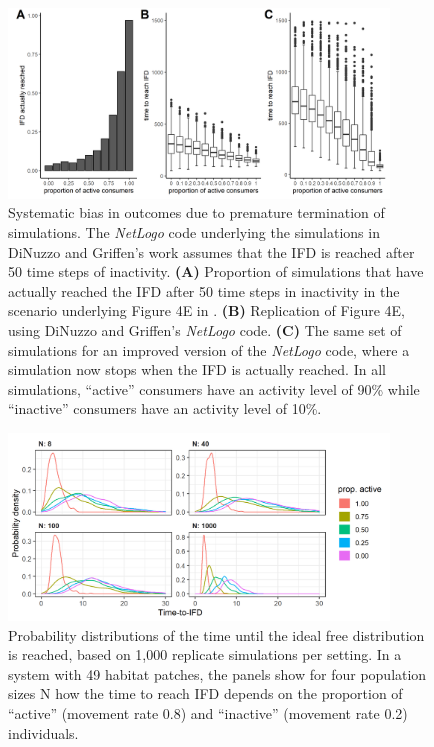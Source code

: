 \begin{interludeenv}
	\begin{figure}[!h]
		\centering
		\includegraphics[width=0.9\textwidth]{figures/boxes/details2.png}
		\caption{
			Systematic bias in outcomes due to premature termination of simulations. 
			The \textit{NetLogo} code underlying the simulations in DiNuzzo and Griffen's work assumes that the IFD is reached after 50 time steps of inactivity. 
			\textbf{(A)} Proportion of simulations that have actually reached the IFD after 50 time steps in inactivity in the scenario underlying Figure 4E in \citet{dinuzzo2020}. 
			\textbf{(B)} Replication of Figure 4E, using DiNuzzo and Griffen's \textit{NetLogo} code. 
			\textbf{(C)} The same set of simulations for an improved version of the \textit{NetLogo} code, where a simulation now stops when the IFD is actually reached. 
			In all simulations, ``active'' consumers have an activity level of 90\% while ``inactive'' consumers have an activity level of 10\%.
		}\label{fig_details_02}
	\end{figure}

	\begin{figure}[!h]
		\centering
		\includegraphics[width=0.9\textwidth]{figures/boxes/details3.png}
		\caption{
			Probability distributions of the time until the ideal free distribution is reached, based on 1,000 replicate simulations per setting. 
			In a system with 49 habitat patches, the panels show for four population sizes N how the time to reach IFD depends on the proportion of ``active'' (movement rate 0.8) and ``inactive'' (movement rate 0.2) individuals.
		}\label{fig_details_03}
	\end{figure}


\end{interludeenv}
